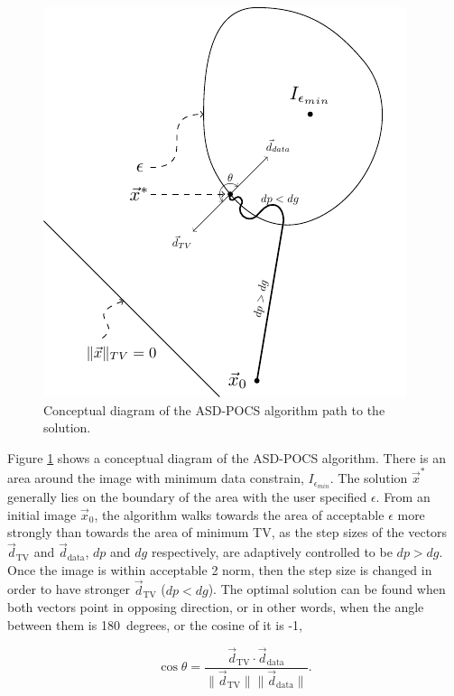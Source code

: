 \begin{figure}[H]
\begin{center}

\includegraphics[scale=1.2]{RecAlgorithms/POCS.pdf} 
\end{center}

\caption[Diagram of the POCS algorithm]{\label{fig:POCSAlgo} Conceptual diagram of the ASD-POCS algorithm path to the solution.} 
\end{figure}


Figure \ref{fig:POCSAlgo} shows a conceptual diagram of the ASD-POCS algorithm. There is an area around the image with minimum data constrain, $I_{\epsilon_{min}}$. The solution $\vec{x}^*$ generally lies on the boundary of the area with the user specified $\epsilon$. From an initial image $\vec{x}_0$, the algorithm walks towards the area of acceptable $\epsilon$ more strongly than towards the area of minimum TV, as the step sizes of the vectors $\vec{d}_{\text{TV}}$ and $\vec{d}_{\text{data}}$, $dp$ and $dg$ respectively, are adaptively controlled to be $dp>dg$. Once the image is within acceptable 2 norm, then the step size is changed in order to have stronger $\vec{d}_{\text{TV}}$ ($dp<dg$). The optimal solution can be found when both vectors point in opposing direction, or in other words, when the angle between them is 180\ degrees, or the cosine of it is -1,

\begin{equation}
\cos \theta = \frac{\vec{d}_{\text{TV}} \cdot \vec{d}_{\text{data}}}{\lVert\vec{d}_{\text{TV}}\rVert \lVert\vec{d}_{\text{data}}\rVert }.
\end{equation}


